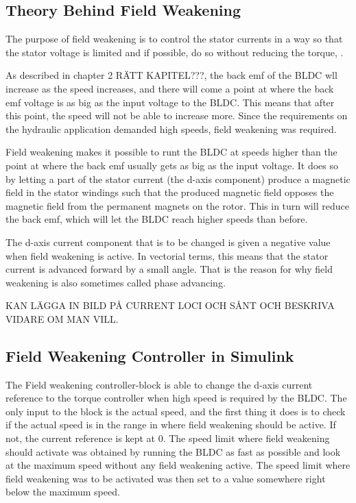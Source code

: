 \documentclass{LTHthesis}
\begin{document}
\subsection{Theory Behind Field Weakening} 
The purpose of field weakening is to control the stator currents in a way so that the stator voltage is limited and if possible, do so without reducing the torque, \cite{ala_kar2014}. 

As described in chapter 2 RÄTT KAPITEL???, the back emf of the BLDC wll increase as the speed increases, and there will come a point at where the back emf voltage is as big as the input voltage to the BLDC. This means that after this point, the speed will not be able to increase more. Since the requirements on the hydraulic application demanded high speeds, field weakening was required.

Field weakening makes it possible to runt the BLDC at speeds higher than the point at where the back emf usually gets as big as the input voltage. It does so by letting a part of the stator current (the d-axis component) produce a magnetic field in the stator windings such that the produced magnetic field opposes the magnetic field from the permanent magnets on the rotor. This in turn will reduce the back emf, which will let the BLDC reach higher speeds than before.

The d-axis current component that is to be changed is given a negative value when field weakening is active. In vectorial terms, this means that the stator current is advanced forward by a small angle. That is the reason for why field weakening is also sometimes called phase advancing.

KAN LÄGGA IN BILD PÅ CURRENT LOCI OCH SÅNT OCH BESKRIVA VIDARE OM MAN VILL.

\subsection{Field Weakening Controller in Simulink}
The Field weakening controller-block is able to change the d-axis current reference to the torque controller when high speed is required by the BLDC. The only input to the block is the actual speed, and the first thing it does is to check if the actual speed is in the range in where field weakening should be active. If not, the current reference is kept at 0. The speed limit where field weakening should activate was obtained by running the BLDC as fast as possible and look at the maximum speed without any field weakening active. The speed limit where field weakening was to be activated was then set to a value somewhere right below the maximum speed.
\end{document}
